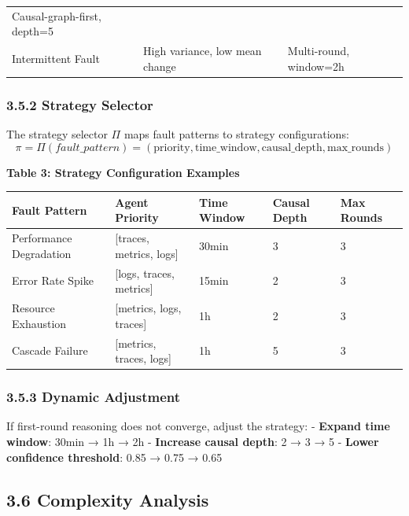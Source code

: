 \begin{longtable}[]{@{}lll@{}}
\begin{minipage}[t]{0.43\columnwidth}
Causal-graph-first, depth=5\strut
\end{minipage}\tabularnewline
\begin{minipage}[t]{0.34\columnwidth}\raggedright
Intermittent Fault\strut
\end{minipage} & \begin{minipage}[t]{0.14\columnwidth}\raggedright
High variance, low mean change\strut
\end{minipage} & \begin{minipage}[t]{0.43\columnwidth}\raggedright
Multi-round, window=2h\strut
\end{minipage}\tabularnewline
\bottomrule
\end{longtable}

\hypertarget{strategy-selector}{%
\subsubsection{3.5.2 Strategy Selector}\label{strategy-selector}}

The strategy selector \(\Pi\) maps fault patterns to strategy
configurations:
\[\pi = \Pi(fault\_pattern) = (\text{priority}, \text{time\_window}, \text{causal\_depth}, \text{max\_rounds})\]

\textbf{Table 3: Strategy Configuration Examples}

\begin{longtable}[]{@{}lllll@{}}
\toprule
Fault Pattern & Agent Priority & Time Window & Causal Depth & Max
Rounds\tabularnewline
\midrule
\endhead
Performance Degradation & {[}traces, metrics, logs{]} & 30min & 3 &
3\tabularnewline
Error Rate Spike & {[}logs, traces, metrics{]} & 15min & 2 &
3\tabularnewline
Resource Exhaustion & {[}metrics, logs, traces{]} & 1h & 2 &
3\tabularnewline
Cascade Failure & {[}metrics, traces, logs{]} & 1h & 5 &
3\tabularnewline
\bottomrule
\end{longtable}

\hypertarget{dynamic-adjustment}{%
\subsubsection{3.5.3 Dynamic Adjustment}\label{dynamic-adjustment}}

If first-round reasoning does not converge, adjust the strategy: -
\textbf{Expand time window}: 30min → 1h → 2h - \textbf{Increase causal
depth}: 2 → 3 → 5 - \textbf{Lower confidence threshold}: 0.85 → 0.75 →
0.65

\hypertarget{complexity-analysis}{%
\subsection{3.6 Complexity Analysis}\label{complexity-analysis}}

